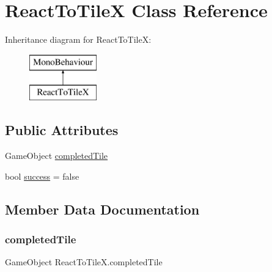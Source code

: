 \hypertarget{class_react_to_tile_x}{}\section{React\+To\+TileX Class Reference}
\label{class_react_to_tile_x}
Inheritance diagram for React\+To\+TileX\+:\begin{figure}[H]
\begin{center}
\leavevmode
\includegraphics[height=2.000000cm]{class_react_to_tile_x}
\end{center}
\end{figure}
\subsection*{Public Attributes}
\begin{DoxyCompactItemize}
\item 
Game\+Object \hyperlink{class_react_to_tile_x_a88b4cd51f4f837a60a0819e1a1b7e02f}{completed\+Tile}
\item 
bool \hyperlink{class_react_to_tile_x_a817252b70745626749066e5f19795429}{success} = false
\end{DoxyCompactItemize}


\subsection{Member Data Documentation}
\mbox{\label{class_react_to_tile_x_a88b4cd51f4f837a60a0819e1a1b7e02f}} 
\subsubsection{\texorpdfstring{completed\+Tile}{completedTile}}
{\footnotesize\ttfamily Game\+Object React\+To\+Tile\+X.\+completed\+Tile}

\mbox{\label{class_react_to_tile_x_a817252b70745626749066e5f19795429}} 
